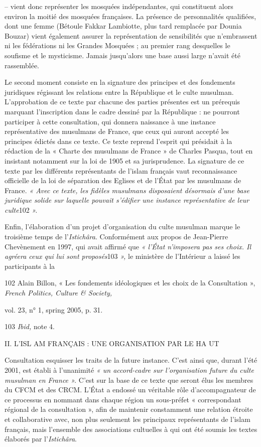 -- vient donc représenter les mosquées indépendantes, qui constituent
alors environ la moitié des mosquées françaises. La présence de
personnalités qualifiées, dont une femme (Bétoule Fakkar Lambiotte, plus
tard remplacée par Dounia Bouzar) vient également assurer la
représentation de sensibilités que n'embrassent ni les fédérations ni
les Grandes Mosquées ; au premier rang desquelles le soufisme et le
mysticisme. Jamais jusqu'alors une base aussi large n'avait été
rassemblée.

Le second moment consiste en la signature des principes et des
fondements juridiques régissant les relations entre la République et le
culte musulman. L'approbation de ce texte par chacune des parties
présentes est un prérequis marquant l'inscription dans le cadre dessiné
par la République : ne pourront participer à cette consultation, qui
donnera naissance à une instance représentative des musulmans de France,
que ceux qui auront accepté les principes édictés dans ce texte. Ce
texte reprend l'esprit qui présidait à la rédaction de la « Charte des
musulmans de France » de Charles Pasqua, tout en insistant notamment sur
la loi de 1905 et sa jurisprudence. La signature de ce texte par les
différents représentants de l'islam français vaut reconnaissance
officielle de la loi de séparation des Eglises et de l'État par les
musulmans de France. \emph{« Avec ce texte, les fidèles musulmans
disposaient désormais d'une base juridique solide sur laquelle pouvait
s'édifier une instance représentative de leur culte}102 \emph{».}

Enfin, l'élaboration d'un projet d'organisation du culte musulman marque
le troisième temps de l'\emph{Istichâra}. Conformément aux propos de
Jean-Pierre Chevènement en 1997, qui avait affirmé que \emph{« l'État
n'imposera pas ses choix. Il agréera ceux qui lui sont proposés}103
\emph{»,} le ministère de l'Intérieur a laissé les participants à la

102 Alain Billon, « Les fondements idéologiques et les choix de la
Consultation », \emph{French Politics, Culture \& Society,}

vol. 23, n° 1, spring 2005, p. 31.

103 \emph{Ibid,} note 4.

II. L'ISL AM FRANÇAIS : UNE ORGANISATION PAR LE HA UT

Consultation esquisser les traits de la future instance. C'est ainsi
que, durant l'été 2001, est établi à l'unanimité \emph{« un accord-cadre
sur l'organisation future du culte musulman en France ».} C'est sur la
base de ce texte que seront élus les membres du CFCM et des CRCM. L'État
a endossé un véritable rôle d'accompagnateur de ce processus en nommant
dans chaque région un sous-préfet « correspondant régional de la
consultation », afin de maintenir constamment une relation étroite et
collaborative avec, non plus seulement les principaux représentants de
l'islam français, mais l'ensemble des associations cultuelles à qui ont
été soumis les textes élaborés par l'\emph{Istichâra}.


